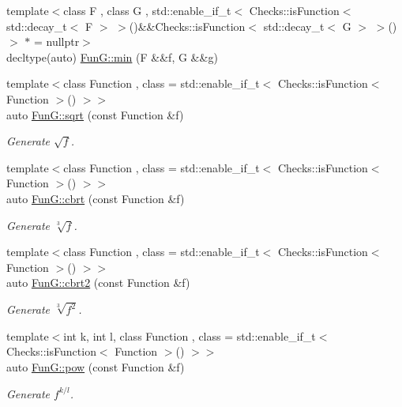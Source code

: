 \begin{DoxyCompactItemize}
\item 
{\footnotesize template$<$class F , class G , std\+::enable\+\_\+if\+\_\+t$<$ Checks\+::is\+Function$<$ std\+::decay\+\_\+t$<$ F $>$ $>$()\&\&\+Checks\+::is\+Function$<$ std\+::decay\+\_\+t$<$ G $>$ $>$() $>$ $\ast$  = nullptr$>$ }\\decltype(auto) \hyperlink{group__CMathGroup_ga3d156db4f00a5d74a7c43c6d8e32f848}{Fun\+G\+::min} (F \&\&f, G \&\&g)
\item 
{\footnotesize template$<$class Function , class  = std\+::enable\+\_\+if\+\_\+t$<$ Checks\+::is\+Function$<$ Function $>$() $>$$>$ }\\auto \hyperlink{group__CMathGroup_ga136c890475e48f88469a737d95368d05}{Fun\+G\+::sqrt} (const Function \&f)
\begin{DoxyCompactList}\small\item\em Generate $ \sqrt{f} $. \end{DoxyCompactList}\item 
{\footnotesize template$<$class Function , class  = std\+::enable\+\_\+if\+\_\+t$<$ Checks\+::is\+Function$<$ Function $>$() $>$$>$ }\\auto \hyperlink{group__CMathGroup_gaa7f2552adfb8ec41aeb685adddd8bf98}{Fun\+G\+::cbrt} (const Function \&f)
\begin{DoxyCompactList}\small\item\em Generate $ \sqrt[3]{f} $. \end{DoxyCompactList}\item 
{\footnotesize template$<$class Function , class  = std\+::enable\+\_\+if\+\_\+t$<$ Checks\+::is\+Function$<$ Function $>$() $>$$>$ }\\auto \hyperlink{group__CMathGroup_gafd27322fb64c6df3366f384c93819a06}{Fun\+G\+::cbrt2} (const Function \&f)
\begin{DoxyCompactList}\small\item\em Generate $ \sqrt[3]{f^2}$. \end{DoxyCompactList}\item 
{\footnotesize template$<$int k, int l, class Function , class  = std\+::enable\+\_\+if\+\_\+t$<$ Checks\+::is\+Function$<$ Function $>$() $>$$>$ }\\auto \hyperlink{group__CMathGroup_gaecae6fa60bbfc0eb1867581ee4577d4e}{Fun\+G\+::pow} (const Function \&f)
\begin{DoxyCompactList}\small\item\em Generate $ f^{k/l} $. \end{DoxyCompactList}\item 

\end{DoxyCompactItemize}
